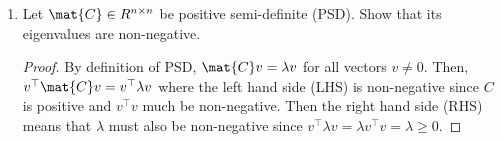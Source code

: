 \documentclass{article}
\begin{document}
\begin{aprob}
\begin{enumerate}
        \begin{proof}
            Since $\mat{B}$ is invertible, $\mat{B}^{-1}$ exists. We will show that $\mat{B}^{-1}$ is symmetric given that $\mat{B}$ is symmetric.
            Since $\mat{B}$ is symmetric, there is some matrix $X$ and a diagonal matrix $D$ such that $\mat{B} = XDX^\top$. Then,
            \begin{align*}
                \mat{B}^{-1} & = (XDX^\top)^{-1} \\
                & = X^{-\top}D^{-1}X^{-1}\\
            \end{align*}
            X is an invertible matrix and the inverse of a diagonal matrix is another diagonal matrix.
            Let $Y = X^{-\top}$ and $D_0$ is a diagonal matrix.
            \begin{align*}
                \mat{B}^{-1} & = YD_0Y^\top \\
            \end{align*}
            Thus, $\mat{B}^{-1}$ is also symmetric.
        \end{proof}
        \newpage
        \item {} Let $\mat{C} \in R^{n \times n}$ be positive semi-definite (PSD). Show that its eigenvalues are non-negative.
        \begin{proof}
            By definition of PSD, $\mat{C}v = \lambda v$ for all vectors $v \neq 0$.
            Then, $v^\top \mat{C}v = v^\top \lambda v$ where the left hand side (LHS) is non-negative since $C$ is positive and $v^\top v$ much be non-negative. 
            Then the right hand side (RHS) means that $\lambda$ must also be non-negative since $v^\top \lambda v = \lambda v^\top v = \lambda \geq 0$.
        \end{proof}
    \end{enumerate}
\end{aprob}

\end{document}
